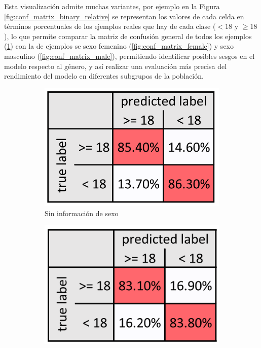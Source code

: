\begin{itemize}
    Esta visualización admite muchas variantes, por ejemplo en la Figura \ref{fig:conf_matrix_binary_relative}
    se representan los valores de cada celda en términos porcentuales de los ejemplos reales que hay de cada 
    clase ($< 18$ y $\ge 18$), lo que permite comparar la matriz de confusión general de todos los ejemplos 
    (\ref{fig:conf_matrix_general}) con la de ejemplos se sexo femenino (\ref{fig:conf_matrix_female}) y 
    sexo masculino (\ref{fig:conf_matrix_male}), permitiendo identificar posibles sesgos en el modelo respecto 
    al género, y así realizar una evaluación más precisa del rendimiento del modelo en diferentes subgrupos de
    la población.
    
    \begin{figure}[h]
        \centering
    
        \begin{subfigure}[b]{0.3\textwidth}
            \centering
            \includegraphics[width=\textwidth]{capitulos/cap_02/imagenes/confusion_matrix_binary_1.png}
            \caption{Sin información de sexo}
            \label{fig:conf_matrix_general}
        \end{subfigure}
        \hfill
        \begin{subfigure}[b]{0.3\textwidth}
            \centering
            \includegraphics[width=\textwidth]{capitulos/cap_02/imagenes/confusion_matrix_binary_2.png}

\end{subfigure}
\end{figure}
\end{itemize}
